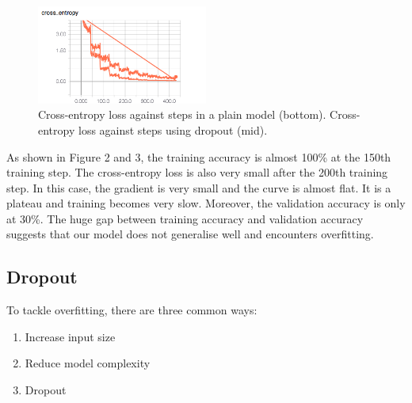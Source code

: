 \documentclass[letterpaper, 12pt]{article}
\begin{document}
\begin{figure}
    \begin{center}
        \includegraphics[width=0.5\textwidth]{cross_entropy}
        \caption{Cross-entropy loss against steps in a plain model (bottom). Cross-entropy loss against steps using dropout (mid).}
    \end{center}
\end{figure}

As shown in Figure 2 and 3, the training accuracy is almost 100\% at the 150th training step. The cross-entropy loss is also
very small after the 200th training step. In this case, the gradient is very small and the curve is almost flat. It is
a plateau and training becomes very slow. Moreover, the validation accuracy is only at 30\%. The huge gap between training
accuracy and validation accuracy suggests that our model does not generalise well and encounters overfitting.

\subsection{Dropout}
To tackle overfitting, there are three common ways:
\begin{center}
    \begin{enumerate}
        \item Increase input size
        \item Reduce model complexity
        \item Dropout
    \end{enumerate}
\end{center}
\end{document}
